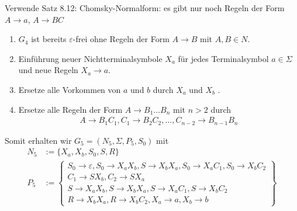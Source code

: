 \begin{lösung}
	Verwende Satz 8.12:
	Chomsky-Normalform: es gibt nur noch Regeln der Form $A\to a$, $A\to BC$
	\begin{enumerate}
		\item $G_4$ ist bereits $\varepsilon$-frei ohne Regeln der Form $A\to B$ mit $A,B\in N$.
		\item Einführung neuer Nichtterminalsymbole $X_a$ für jedes Terminalsymbol $a\in\Sigma$ und neue Regeln $X_a\to a$.
		\item Ersetze alle Vorkommen von $a$ und $b$ durch $X_a$  und $X_b$ .
		\item Ersetze alle Regeln der Form $A\to B_1\ldots B_n$ mit $n>2$ durch 
		\begin{align*}
			A\to B_1C_1,C_1\to B_2C_2,\ldots,C_{n-2}\to B_{n-1}B_n
		\end{align*}
	\end{enumerate}
	Somit erhalten wir $G_5=(N_5,\Sigma,P_5,S_0)$ mit
	\begin{align*}
		N_5&:=\big\lbrace X_a,X_b,S_0,S,R\big\rbrace\\
		P_5&:=\left\lbrace\begin{array}{l}
			S_0\to\varepsilon, S_0\to X_a X_b, S\to X_b X_a, S_0\to X_a C_1,S_0\to X_b C_2\\
			C_1\to SX_b,C_2\to SX_a\\
			S\to X_aX_b,S\to X_bX_a,S\to X_aC_1, S\to X_b C_2\\
			R\to X_bX_a, R\to X_bC_2,X_a\to a,X_b\to b
		\end{array}\right\rbrace
	\end{align*}
\end{lösung}